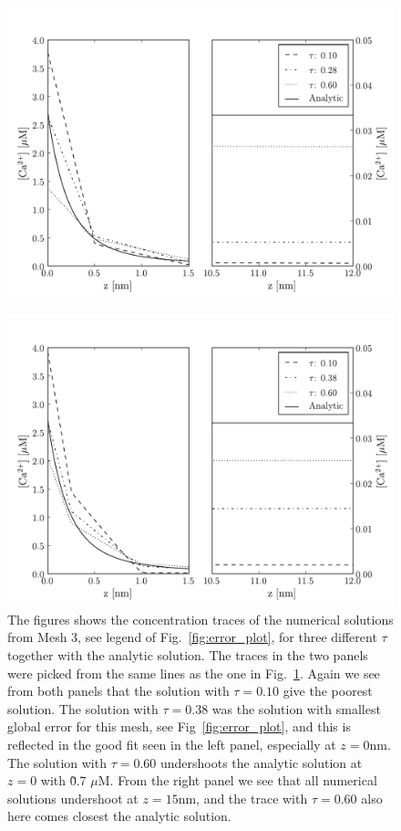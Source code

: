 \begin{figure}[t]
  \centering
    \includegraphics[width=\leftfigsize]{chapters/hake/pdf/traces_mesh_2}
    \caption{\captiontwo}
    \label{fig:traces_mesh_2}
\end{figure}

\newcommand{\captionthree}{The figures shows the concentration traces of the numerical solutions from Mesh 3, see legend of Fig.~\ref{fig:error_plot}, for three different $\tau$ together with the analytic solution. The traces in the two panels were picked from the same lines as the one in Fig.~\ref{fig:traces_mesh_2}. Again we see from both panels that the solution with $\tau=0.10$ give the poorest solution. The solution with $\tau=0.38$ was the solution with smallest global error for this mesh, see Fig~\ref{fig:error_plot}, and this is reflected in the good fit seen in the left panel, especially at $z=0$nm. The solution with $\tau=0.60$ undershoots the analytic solution at $z=0$ with \~0.7 $\mu$M. From the right panel we see that all numerical solutions undershoot at $z=15$nm, and the trace with $\tau=0.60$ also here comes closest the analytic solution.}

\begin{figure}[t]
  \centering
    \includegraphics[width=\leftfigsize]{chapters/hake/pdf/traces_mesh_3}
    \caption{\captionthree}
    \label{fig:traces_mesh_3}
\end{figure}

